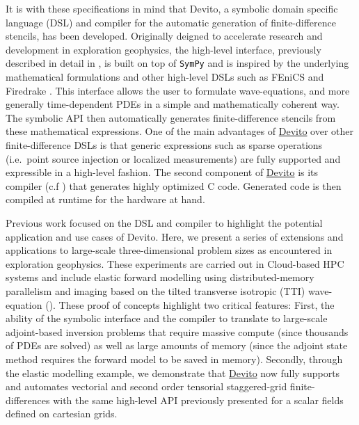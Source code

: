 \documentclass[conference]{IEEEtran}
\begin{document}
It is with these specifications in mind that Devito, a symbolic domain
specific language (DSL) and compiler for the automatic generation of
finite-difference stencils, has been developed. Originally deigned to
accelerate research and development in exploration geophysics, the
high-level interface, previously described in detail in
\cite{devito-api}, is built on top of \texttt{SymPy} \cite{sympy} and
is inspired by the underlying mathematical formulations and other
high-level DSLs such as FEniCS \cite{fenics} and Firedrake
\cite{firedrake}. This interface allows the user to formulate
wave-equations, and more generally time-dependent PDEs in a simple and
mathematically coherent way. The symbolic API then automatically
generates finite-difference stencils from these mathematical
expressions. One of the main advantages of
\href{https://github.com/devitocodes/devito}{Devito} over other
finite-difference DSLs is that generic expressions such as sparse
operations (i.e.~point source injection or localized measurements) are
fully supported and expressible in a high-level fashion. The second
component of \href{https://github.com/devitocodes/devito}{Devito} is its
compiler (c.f \cite{devito-compiler}) that generates highly optimized C
code. Generated code is then compiled at runtime for the hardware at
hand.

Previous work focused on the DSL and compiler to highlight the potential
application and use cases of Devito. Here, we present a series of
extensions and applications to large-scale three-dimensional problem
sizes as encountered in exploration geophysics. These experiments are
carried out in Cloud-based HPC systems and include elastic forward
modelling using distributed-memory parallelism and imaging based on the
tilted transverse isotropic (TTI) wave-equation
(\cite{virieux, thomsen1986, zhang-tti, duveneck, louboutin2018segeow}).
These proof of concepts highlight two critical features: First, the
ability of the symbolic interface and the compiler to translate to
large-scale adjoint-based inversion problems that require massive
compute (since thousands of PDEs are solved) as well as large amounts of
memory (since the adjoint state method requires the forward model to be
saved in memory). Secondly, through the elastic modelling example, we
demonstrate that \href{https://github.com/devitocodes/devito}{Devito}
now fully supports and automates vectorial and second order tensorial
staggered-grid finite-differences with the same high-level API
previously presented for a scalar fields defined on cartesian grids.
\end{document}
